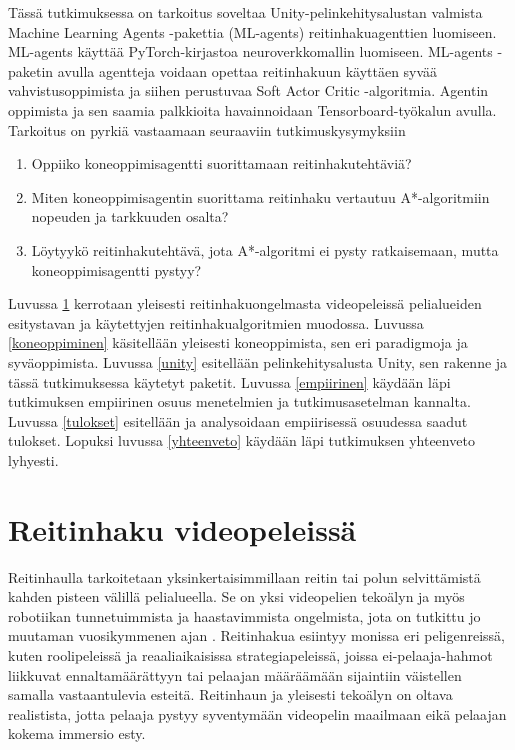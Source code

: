\documentclass[utf8]{gradu3}
\begin{document}
Tässä tutkimuksessa on tarkoitus soveltaa Unity-pelinkehitysalustan valmista Machine Learning Agents -pakettia (ML-agents) reitinhakuagenttien luomiseen. ML-agents käyttää PyTorch-kirjastoa neuroverkkomallin luomiseen. ML-agents -paketin avulla agentteja voidaan opettaa reitinhakuun käyttäen syvää vahvistusoppimista ja siihen perustuvaa Soft Actor Critic -algoritmia. Agentin oppimista ja sen saamia palkkioita havainnoidaan Tensorboard-työkalun avulla. Tarkoitus on pyrkiä vastaamaan seuraaviin tutkimuskysymyksiin

\begin{enumerate}
\item Oppiiko koneoppimisagentti suorittamaan reitinhakutehtäviä?
\item Miten koneoppimisagentin suorittama reitinhaku vertautuu A*-algoritmiin nopeuden ja tarkkuuden osalta?
\item Löytyykö reitinhakutehtävä, jota A*-algoritmi ei pysty ratkaisemaan, mutta koneoppimisagentti pystyy?
\end{enumerate}

Luvussa \ref{reitinhakupeleis} kerrotaan yleisesti reitinhakuongelmasta videopeleissä pelialueiden esitystavan ja käytettyjen reitinhakualgoritmien muodossa. Luvussa \ref{koneoppiminen} käsitellään yleisesti koneoppimista, sen eri paradigmoja ja syväoppimista. Luvussa \ref{unity} esitellään pelinkehitysalusta Unity, sen rakenne ja tässä tutkimuksessa käytetyt paketit. Luvussa \ref{empiirinen} käydään läpi tutkimuksen empiirinen osuus menetelmien ja tutkimusasetelman kannalta. Luvussa \ref{tulokset} esitellään ja analysoidaan empiirisessä osuudessa saadut tulokset. Lopuksi luvussa \ref{yhteenveto} käydään läpi tutkimuksen yhteenveto lyhyesti.

\chapter{Reitinhaku videopeleissä}
\label{reitinhakupeleis}

Reitinhaulla tarkoitetaan yksinkertaisimmillaan reitin tai polun selvittämistä kahden pisteen välillä pelialueella. Se on yksi videopelien tekoälyn ja myös robotiikan tunnetuimmista ja haastavimmista ongelmista, jota on tutkittu jo muutaman vuosikymmenen ajan \parencite{abd2015comprehensive,cui2011based}. Reitinhakua esiintyy monissa eri peligenreissä, kuten roolipeleissä ja reaaliaikaisissa strategiapeleissä, joissa ei-pelaaja-hahmot liikkuvat ennaltamäärättyyn tai pelaajan määräämään sijaintiin väistellen samalla vastaantulevia esteitä. Reitinhaun ja yleisesti tekoälyn on oltava realistista, jotta pelaaja pystyy syventymään videopelin maailmaan eikä pelaajan kokema immersio esty.
\end{document}
